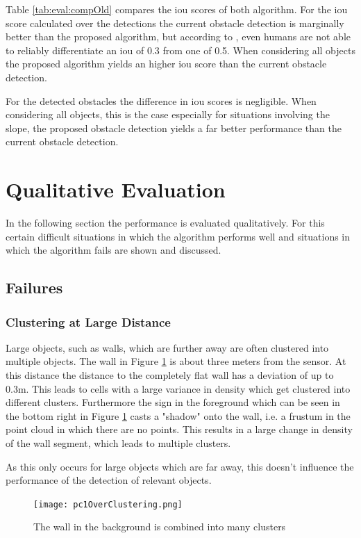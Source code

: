 Table \ref{tab:eval:compOld} compares the \ac{iou} scores of both algorithm. 
For the \ac{iou} score calculated over the detections the current obstacle detection is marginally better than the proposed algorithm, but according to \cite{ioumurks}, even humans are not able to reliably differentiate an \ac{iou} of 0.3 from one of 0.5.
When considering all objects the proposed algorithm yields an higher \ac{iou} score than the current obstacle detection.

For the detected obstacles the difference in \ac{iou} scores is negligible.
When considering all objects, this is the case especially for situations involving the slope, the proposed obstacle detection yields a far better performance than the current obstacle detection. 

\section{Qualitative Evaluation}
In the following section the performance is evaluated qualitatively. For this certain difficult situations in which the algorithm performs well and situations in which the algorithm fails are shown and discussed.

\subsection{Failures}
\subsubsection{Clustering at Large Distance}
Large objects, such as walls, which are further away are often clustered into multiple objects. The wall in Figure \ref{fig:eval:pc1OverClustering} is
about three meters from the sensor. At this distance the distance to the
completely flat wall has a deviation of up to 0.3m. This leads to cells with a large variance in density which get clustered into different clusters.
Furthermore the sign in the foreground which can be seen in the bottom right
in Figure \ref{fig:eval:pc1OverClustering} casts a "shadow" onto the wall,
i.e. a frustum in the point cloud in which there are no points. This results in
a large change in density of the wall segment, which leads to multiple clusters.

As this only occurs for large objects which are far away, this doesn't influence the performance of the detection of relevant objects.
\begin{figure}[h!]
    \centering
    \texttt{[image: pc1OverClustering.png]}
    \caption{The wall in the background is combined into many clusters}
    \label{fig:eval:pc1OverClustering}
\end{figure}

